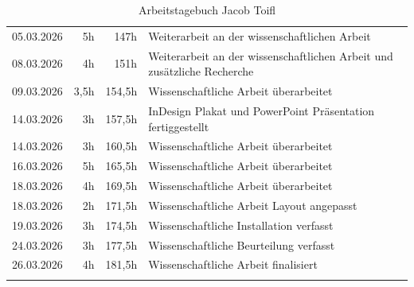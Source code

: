 \begin{longtable}{r | r | r | p{}}
    05.03.2026 & 5h & 147h & Weiterarbeit an der wissenschaftlichen Arbeit \\
    08.03.2026 & 4h & 151h & Weiterarbeit an der wissenschaftlichen Arbeit und zusätzliche Recherche \\
    09.03.2026 & 3,5h & 154,5h & Wissenschaftliche Arbeit überarbeitet \\
    14.03.2026 & 3h & 157,5h & InDesign Plakat und PowerPoint Präsentation fertiggestellt \\
    14.03.2026 & 3h & 160,5h & Wissenschaftliche Arbeit überarbeitet \\
    16.03.2026 & 5h & 165,5h & Wissenschaftliche Arbeit überarbeitet \\
    18.03.2026 & 4h & 169,5h & Wissenschaftliche Arbeit überarbeitet \\
    18.03.2026 & 2h & 171,5h & Wissenschaftliche Arbeit Layout angepasst \\
    19.03.2026 & 3h & 174,5h & Wissenschaftliche Installation verfasst \\
    24.03.2026 & 3h & 177,5h & Wissenschaftliche Beurteilung verfasst \\
    26.03.2026 & 4h & 181,5h & Wissenschaftliche Arbeit finalisiert \\ \hline
    \caption{Arbeitstagebuch Jacob Toifl} \label{tab:arbeitstagebuch_jacob}
\end{longtable}

